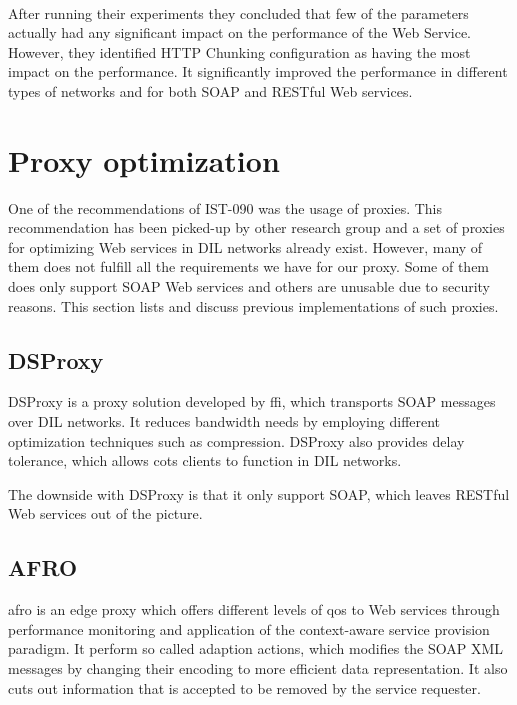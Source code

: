 \paragraph{}
After running their experiments they concluded that few of the parameters
actually had any significant impact on the performance of the Web Service.
However, they identified HTTP Chunking configuration as having the most impact
on the performance. It significantly improved the performance in different types
of networks and for both SOAP and RESTful Web services.


\section{Proxy optimization}

One of the recommendations of IST-090 was the usage of proxies. This
recommendation has been picked-up by other research group and a set of proxies
for optimizing Web services in DIL networks already exist. However, many of them
does not fulfill all the requirements we have for our proxy. Some of them does
only support SOAP Web services and others are unusable due to security reasons.
This section lists and discuss previous implementations of such proxies.

\subsection{DSProxy}

DSProxy is a proxy solution developed by \gls{ffi}, which transports SOAP
messages over DIL networks\cite{ieee-dsproxy}. It reduces bandwidth needs by
employing different optimization techniques such as compression. DSProxy also
provides delay tolerance, which allows \gls{cots} clients to function in DIL
networks.

The downside with DSProxy is that it only support SOAP, which leaves RESTful Web
services out of the picture.

\subsection{AFRO}

\gls{afro} is an edge proxy which offers different levels of \gls{qos} to Web
services through performance monitoring and application of the context-aware
service provision paradigm\cite{ist-090}. It perform so called adaption actions, which
modifies the SOAP XML messages by changing their encoding to more efficient data
representation. It also cuts out information that is accepted to be removed by
the service requester.

